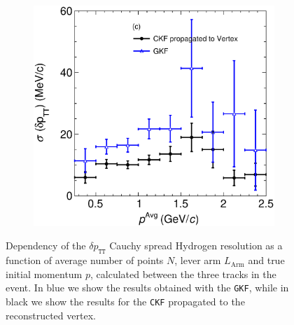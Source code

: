 \begin{figure}[t]
\begin{subfigure}[b]{0.32\textwidth}
         \caption{}
        \label{fig:deltapTTVSAvglArmMC.eps}
     \end{subfigure}
     \begin{subfigure}[b]{0.32\textwidth}
         \centering
         \includegraphics[width=\textwidth]{figures/ch6-TKI/2D/deltapTTVSAvgp.eps}
         \caption{}
         \label{fig:deltapTTVSAvgp.eps}
     \end{subfigure}
        \caption{Dependency of the $\delta p_\texttt{TT}$ Cauchy spread Hydrogen resolution as a function of average number of points $N$, lever arm $L_\text{Arm}$ and true initial momentum $p$, calculated between the three tracks in the event. In blue we show the results obtained with the \texttt{\texttt{GKF}}, while in black we show the results for the \texttt{\texttt{CKF}} propagated to the reconstructed vertex.} \label{fig:dpTTVSAvg}
\end{figure}

